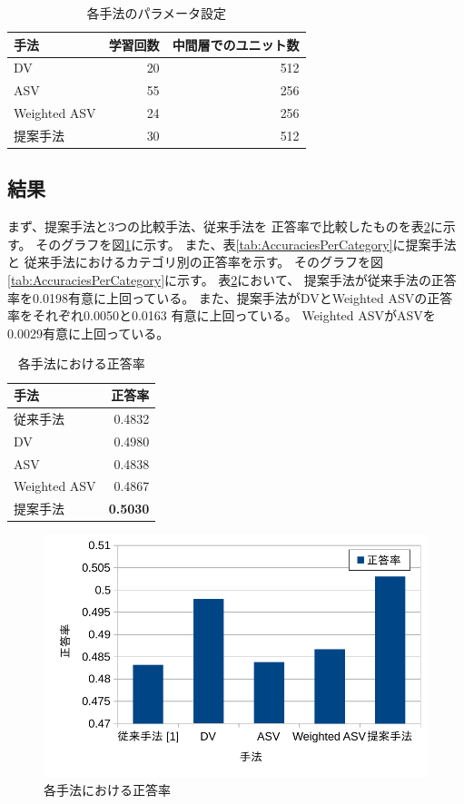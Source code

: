 \begin{table}
  \caption{各手法のパラメータ設定}
  \centering
  \begin{tabular}{l | r r} \label{tab:ParametersOfMethods}
    手法 & 学習回数 & 中間層でのユニット数 \\
    \hline
    DV & 20 & 512 \\
    ASV & 55 & 256 \\
    Weighted ASV & 24 & 256 \\
    提案手法 & 30 & 512 \\
  \end{tabular}
\end{table}


\subsection{結果}

まず、提案手法と3つの比較手法、従来手法\cite{fujitani15}を
正答率で比較したものを表\ref{tab:AccuraciesOfMethods}に示す。
そのグラフを図\ref{fig:AccuraciesOfMethods}に示す。
また、表\ref{tab:AccuraciesPerCategory}に提案手法と
従来手法\cite{fujitani15}におけるカテゴリ別の正答率を示す。
そのグラフを図\ref{tab:AccuraciesPerCategory}に示す。
表\ref{tab:AccuraciesOfMethods}において、
提案手法が従来手法\cite{fujitani15}の正答率を0.0198有意に上回っている。
また、提案手法がDVとWeighted ASVの正答率をそれぞれ0.0050と0.0163
有意に上回っている。
Weighted ASVがASVを0.0029有意に上回っている。

\begin{table}
  \caption{各手法における正答率}
  \centering
  \begin{tabular}{l | r} \label{tab:AccuraciesOfMethods}
    手法 & 正答率 \\
    \hline
    従来手法\cite{fujitani15} & 0.4832 \\
    DV & 0.4980 \\
    ASV & 0.4838 \\
    Weighted ASV & 0.4867 \\
    提案手法 & \textbf{0.5030} \\
  \end{tabular}
\end{table}

\begin{figure}
  \includegraphics{fig/graph_of_accuracies_of_methods.pdf}
  \caption{各手法における正答率}
  \label{fig:AccuraciesOfMethods}
\end{figure}

